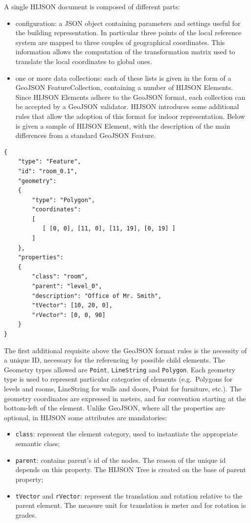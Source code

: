 \documentclass{sig-alternate}
\begin{document}
A single HIJSON document is composed of different parts:

\begin{itemize}
\itemsep1pt\parskip0pt
\item
  configuration: a JSON object containing parameters and settings useful
  for the building representation. In particular three points of the
  local reference system are mapped to three couples of geographical
  coordinates. This information allows the computation of the
  transformation matrix used to translate the local coordinates to
  global ones.
\item
  one or more data collections: each of these lists is given in the form
  of a GeoJSON FeatureCollection, containing a number of HIJSON
  Elements. Since HIJSON Elements adhere to the GeoJSON format, each
  collection can be accepted by a GeoJSON validator. HIJSON introduces
  some additional rules that allow the adoption of this format for
  indoor representation. Below is given a sample of HIJSON Element, with
  the description of the main differences from a standard GeoJSON
  Feature.
\end{itemize}

\begin{verbatim}
{
    "type": "Feature",
    "id": "room_0.1",
    "geometry": 
    {
        "type": "Polygon",
        "coordinates": 
        [ 
           [ [0, 0], [11, 0], [11, 19], [0, 19] ]
        ]    
    },
    "properties": 
    {
        "class": "room",
        "parent": "level_0",
        "description": "Office of Mr. Smith",
        "tVector": [10, 20, 0],
        "rVector": [0, 0, 90]
    }
}
\end{verbatim}

The first additional requisite above the GeoJSON format rules is the
necessity of a unique ID, necessary for the referencing by possible
child elements. The Geometry types allowed are \texttt{Point},
\texttt{LineString} and \texttt{Polygon}. Each geometry type is used to
represent particular categories of elements (e.g.~Polygons for levels
and rooms, LineString for walls and doors, Point for furniture, etc.).
The geometry coordinates are expressed in meters, and for convention
starting at the bottom-left of the element. Unlike GeoJSON, where all
the properties are optional, in HIJSON some attributes are mandatories:

\begin{itemize}
\itemsep1pt\parskip0pt
\item
  \texttt{class}: represent the element category, used to instantiate
  the appropriate semantic class;
\item
  \texttt{parent}: contains parent's id of the nodes. The reason of the
  unique id depends on this property. The HIJSON Tree is created on the
  base of parent property;
\item
  \texttt{tVector} and \texttt{rVector}: represent the translation and
  rotation relative to the parent element. The measure unit for
  translation is meter and for rotation is grades.
\end{itemize}
\end{document}
